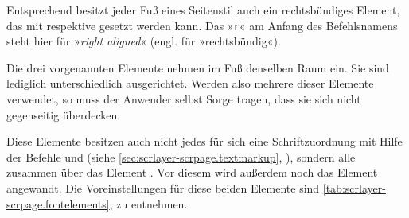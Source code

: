 Entsprechend besitzt jeder Fuß eines Seitenstil auch ein
rechtsbündiges Element, das mit 
respektive  gesetzt werden kann. Das »\texttt{r}« am Anfang des
Befehlsnamens steht hier für »\emph{right aligned}« (engl. für
»rechtsbündig«).

Die drei vorgenannten Elemente nehmen im Fuß denselben
Raum ein. Sie sind lediglich unterschiedlich ausgerichtet. Werden also mehrere
dieser Elemente verwendet, so muss der Anwender selbst Sorge tragen, dass sie
sich nicht gegenseitig überdecken.

\BeginIndexGroup
{}%
%
Diese Elemente besitzen auch nicht jedes für sich eine Schriftzuordnung mit
Hilfe der Befehle  und
 (siehe
\autoref{sec:scrlayer-scrpage.textmarkup},
), sondern alle zusammen über das
Element . Vor diesem
wird außerdem noch das Element
angewandt. Die Voreinstellungen für diese beiden Elemente sind
\autoref{tab:scrlayer-scrpage.fontelements},
 zu entnehmen.%
\EndIndexGroup

